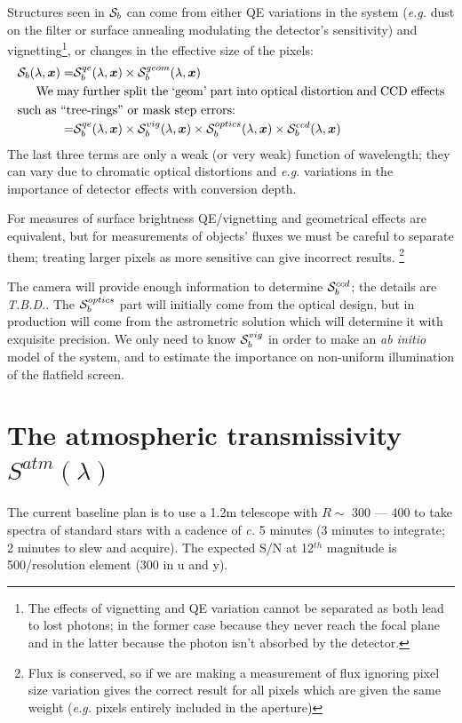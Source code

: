 \documentclass[12pt]{article}
\renewcommand{\c}{\textit{c.}\xspace}
\newcommand{\eg}{\textit{e.g.}\xspace}
\newcommand{\xb}{{\boldsymbol x}}
\newcommand{\qe}{{\cal S}}
\newcommand{\TBD}{\textit{T.B.D.}\xspace}
\begin{document}
Structures seen in $\qe_b$ can come from either QE variations in the system (\eg dust on the filter or surface
annealing modulating the detector's sensitivity) and vignetting\footnote{
The effects of vignetting and QE variation cannot be separated as both lead to
lost photons; in the former case because they never reach the focal plane and in the latter because
the photon isn't absorbed by the detector. }, or changes in the effective size of the
pixels:
\begin{align*}
\qe_b(\lambda, \xb) =& \qe_b^{qe}(\lambda, \xb) \times \qe_b^{geom}(\lambda, \xb)\\
\noalign{
  We may further split the `geom' part into optical distortion and CCD effects such as
  ``tree-rings'' or mask step errors:
  }
                    =& \qe_b^{qe}(\lambda, \xb) \times
                       \qe_b^{vig}(\lambda, \xb) \times
                       \qe_b^{optics}(\lambda, \xb) \times
                       \qe_b^{ccd}(\lambda, \xb)
\end{align*}
The last three terms are only a weak (or very weak) function of wavelength; they can vary due to chromatic
optical distortions and \eg variations in the importance of detector effects with conversion depth.

For measures of surface brightness QE/vignetting and geometrical effects are equivalent, but for measurements of objects'
fluxes we must be careful to separate them; treating larger pixels as more sensitive can give incorrect
results.%
\footnote{Flux is conserved, so if we are making a measurement of flux ignoring pixel size
  variation gives the correct result for all pixels which are given the same weight (\eg pixels entirely included in the aperture)}

The camera will provide enough information to determine $\qe_b^{ccd}$; the details are \TBD.  The
$\qe_b^{optics}$ part will initially come from the optical design, but in production will come from the
astrometric solution which will determine it with exquisite precision.  We only need to know $\qe_b^{vig}$ in
order to make an \textit{ab initio} model of the system, and to estimate the importance on non-uniform
illumination of the flatfield screen.

\section{The atmospheric transmissivity $S^{atm}(\lambda)$}

The current baseline plan is to use a 1.2m telescope with $R \sim $ 300 --- 400 to
take spectra of standard stars with a cadence of \c 5 minutes (3 minutes
to integrate;  2 minutes to slew and acquire).  The expected
S/N at 12$^{th}$ magnitude is 500/resolution element (300 in u and y).
\end{document}
